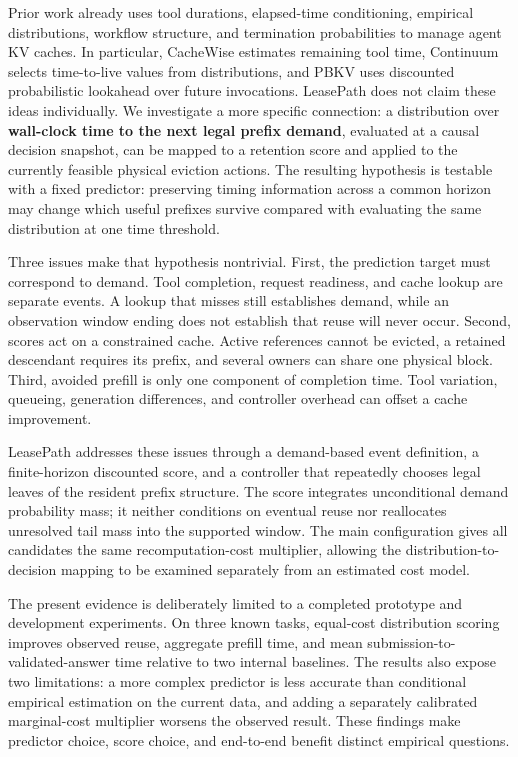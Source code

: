 \documentclass[sigconf, screen, review]{acmart}
\begin{document}
Prior work already uses tool durations, elapsed-time conditioning,
empirical distributions, workflow structure, and termination
probabilities to manage agent KV caches. In particular, CacheWise
estimates remaining tool time, Continuum selects time-to-live values
from distributions, and PBKV uses discounted probabilistic lookahead
over future invocations. LeasePath does not claim these ideas
individually. We investigate a more specific connection: a distribution
over \textbf{wall-clock time to the next legal prefix demand}, evaluated
at a causal decision snapshot, can be mapped to a retention score and
applied to the currently feasible physical eviction actions. The
resulting hypothesis is testable with a fixed predictor: preserving
timing information across a common horizon may change which useful
prefixes survive compared with evaluating the same distribution at one
time threshold.

Three issues make that hypothesis nontrivial. First, the prediction
target must correspond to demand. Tool completion, request readiness,
and cache lookup are separate events. A lookup that misses still
establishes demand, while an observation window ending does not
establish that reuse will never occur. Second, scores act on a
constrained cache. Active references cannot be evicted, a retained
descendant requires its prefix, and several owners can share one
physical block. Third, avoided prefill is only one component of
completion time. Tool variation, queueing, generation differences, and
controller overhead can offset a cache improvement.

LeasePath addresses these issues through a demand-based event
definition, a finite-horizon discounted score, and a controller that
repeatedly chooses legal leaves of the resident prefix structure. The
score integrates unconditional demand probability mass; it neither
conditions on eventual reuse nor reallocates unresolved tail mass into
the supported window. The main configuration gives all candidates the
same recomputation-cost multiplier, allowing the
distribution-to-decision mapping to be examined separately from an
estimated cost model.

The present evidence is deliberately limited to a completed prototype
and development experiments. On three known tasks, equal-cost
distribution scoring improves observed reuse, aggregate prefill time,
and mean submission-to-validated-answer time relative to two internal
baselines. The results also expose two limitations: a more complex
predictor is less accurate than conditional empirical estimation on the
current data, and adding a separately calibrated marginal-cost
multiplier worsens the observed result. These findings make predictor
choice, score choice, and end-to-end benefit distinct empirical
questions.
\end{document}
